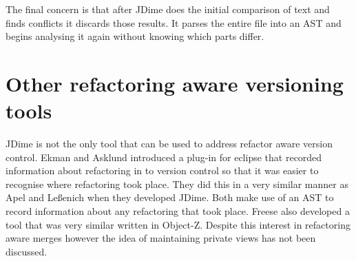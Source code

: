The final concern is that after JDime does the initial comparison of text and finds conflicts it discards those results. It parses the entire file into an AST and begins analysing it again without knowing which parts differ.   

\section{Other refactoring aware versioning tools}
JDime is not the only tool that can be used to address refactor aware version control.  Ekman and Asklund \cite{Ekman2004} introduced a plug-in for eclipse that recorded information about refactoring in to version control so that it was easier to recognise where refactoring took place.  They did this in a very similar manner as Apel and Le{\ss}enich when they developed JDime.  Both make use of an AST to record information about any refactoring that took place.  Freese \cite{Freese2006} also developed a tool that was very similar written in Object-Z. Despite this interest in refactoring aware merges however the idea of maintaining private views has not been discussed.
